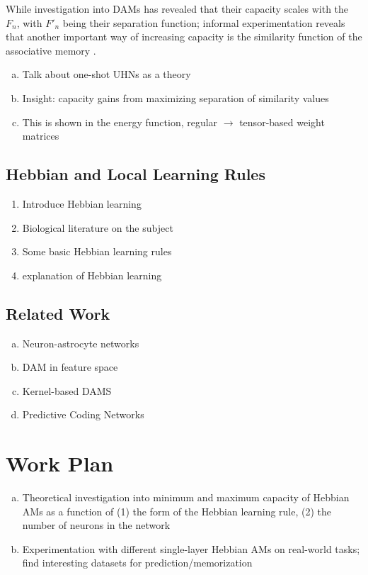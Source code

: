 \documentclass{article}
\theoremstyle{definition}
\begin{document}
While investigation into DAMs has revealed that their capacity scales with 
the $F_n$, with $F'_n$ being their separation function; informal experimentation
reveals that another important way of increasing capacity is the similarity function
of the associative memory \parencites{millidge_predictive_2022,hu_provably_2024}.

\begin{enumerate}[(a)]
    \item Talk about one-shot UHNs as a theory
    \item Insight: capacity gains from maximizing separation of similarity values
    \item This is shown in the energy function, regular $\to$ tensor-based weight matrices
\end{enumerate}

\subsection{Hebbian and Local Learning Rules}\label{sec:hebb}

\begin{enumerate}
    \item Introduce Hebbian learning
    \item Biological literature on the subject
    \item Some basic Hebbian learning rules
    \item \textcite{gerstner_mathematical_2002} explanation of Hebbian learning
\end{enumerate}

\subsection{Related Work}\label{sec:related-work}

\begin{enumerate}[(a)]
    \item Neuron-astrocyte networks
    \item DAM in feature space
    \item Kernel-based DAMS
    \item Predictive Coding Networks
\end{enumerate}

\section{Work Plan}

\begin{enumerate}[(a)]
    \item Theoretical investigation into minimum and maximum capacity of Hebbian AMs 
    as a function of (1) the form of the Hebbian learning rule, (2) the number of neurons in the network
    \item Experimentation with different single-layer Hebbian AMs on real-world tasks; 
    find interesting datasets for prediction/memorization
\end{enumerate}
\end{document}
